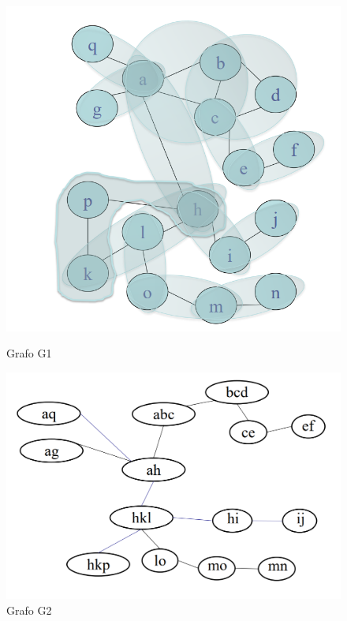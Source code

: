 \begin{figure}[H]
    \centering
    \begin{minipage}[b]{0.45\linewidth}
        \includegraphics[width=\linewidth]{chapters/images/g1.png}
        \caption{Grafo G1}
        \label{fig:5}
    \end{minipage}
    \hspace{0.5cm}
    \begin{minipage}[b]{0.45\linewidth}
        \includegraphics[width=\linewidth]{chapters/images/g2.png}
        \caption{Grafo G2}
        \label{fig:6}
    \end{minipage}
\end{figure}

